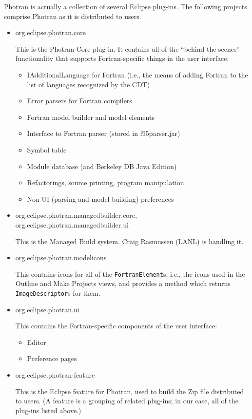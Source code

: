 
Photran is actually a collection of several Eclipse plug-ins.
The following projects comprise Photran as it is distributed to users.

\begin{itemize}
\item{org.eclipse.photran.core

	This is the Photran Core plug-in.  It
	contains all of the ``behind the scenes'' functionality that
	supports Fortran-specific things in the user interface:
\begin{itemize}
	\item{IAdditionalLanguage for Fortran (i.e., the means
              of adding Fortran to the list of languages recognized
              by the CDT)}
	\item{Error parsers for Fortran compilers}
	\item{Fortran model builder and model elements}
	\item{Interface to Fortran parser (stored in f95parser.jar)}
	\item{Symbol table}
	\item{Module database (and Berkeley DB Java Edition)}
	\item{Refactorings, source printing, program manipulation}
	\item{Non-UI (parsing and model building) preferences}
\end{itemize}}

\item{org.eclipse.photran.managedbuilder.core, org.eclipse.photran.managedbuilder.ui

	This is the Managed Build system.
	Craig Rasmussen (LANL) is handling it.}

\item{org.eclipse.photran.modelicons

	This contains icons for all of the \texttt{FortranElement}s, i.e.,
	the icons used in the Outline and Make Projects views, and
	provides a method which returns \texttt{ImageDescriptor}s for them.}

\item{org.eclipse.photran.ui

	This contains the Fortran-specific components of the user interface:
\begin{itemize}
	\item{Editor}
	\item{Preference pages}
\end{itemize}}

\item{org.eclipse.photran-feature

	This is the Eclipse feature for Photran, used to build the Zip
	file distributed to users.  (A feature is a grouping of related
	plug-ins; in our case, all of the plug-ins listed above.)}

\end{itemize}


